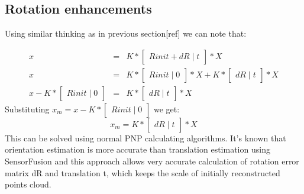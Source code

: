 \subsection{Rotation enhancements}
Using similar thinking as in previous section[ref] we can note that:

\begin{equation} \label{eq:projectionRotError1}
\begin{array}{rcl}
 x & = & K * \begin{bmatrix}Rinit + dR\mid t\end{bmatrix} * X \\
 x & = & K * \begin{bmatrix}Rinit\mid 0\end{bmatrix} * X + K * \begin{bmatrix}dR\mid t\end{bmatrix} * X \\
 x - K * \begin{bmatrix}Rinit\mid 0\end{bmatrix} & = & K * \begin{bmatrix}dR\mid t\end{bmatrix} * X
\end{array}
\end{equation}
Substituting $x_{m} = x - K * \begin{bmatrix}Rinit\mid 0\end{bmatrix}$ we get: 
\begin{equation} \label{eq:projectionRotError2}
x_{m} = K * \begin{bmatrix}dR\mid t\end{bmatrix} * X
\end{equation}
This can be solved using normal PNP calculating algorithms. It's known that orientation estimation is more accurate than translation estimation using SensorFusion and this approach allows very accurate calculation of rotation error matrix dR and translation t, which keeps the scale of initially reconstructed points cloud.
